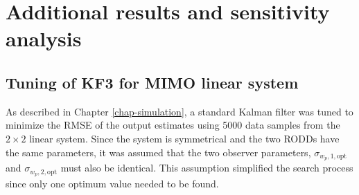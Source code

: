 \chapter{Additional results and sensitivity analysis}     %
\label{chap-Annex}                   %

%

\section{Tuning of KF3 for MIMO linear system} \label{sec:annex-sim-2-KF-tuning}

As described in Chapter \ref{chap-simulation}, a standard Kalman filter was tuned to minimize the \gls{RMSE} of the output estimates using 5000 data samples from the $2\times2$ linear system. Since the system is symmetrical and the two \gls{RODD}s have the same parameters, it was assumed that the two observer parameters, $\sigma_{w_p,1,\text{opt}}$ and $\sigma_{w_p,2,\text{opt}}$ must also be identical. This assumption simplified the search process since only one optimum value needed to be found.

